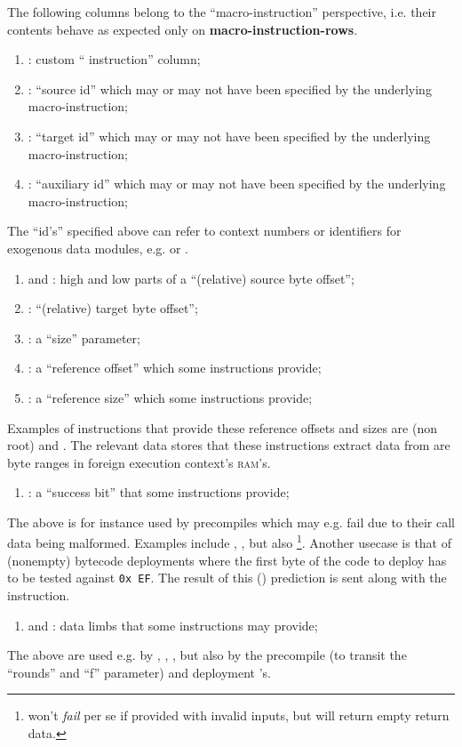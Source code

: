 The following columns belong to the ``macro-instruction'' perspective, i.e. their contents behave as expected only on 
\textbf{macro-instruction-rows}. 
\begin{enumerate}
	\item \macroInst{}:
		custom ``\mmuMod{} instruction'' column;
	\item \macroSrcId{}:
		``source id'' which may or may not have been specified by the underlying macro-instruction;
	\item \macroTgtId{}:
		``target id'' which may or may not have been specified by the underlying macro-instruction;
	\item \macroAuxId{}:
		``auxiliary id'' which may or may not have been specified by the underlying macro-instruction;
\end{enumerate}
The ``id's'' specified above can refer to context numbers or identifiers for exogenous data modules, e.g. \kecStamp{} or \cfi{}.
\begin{enumerate}[resume]
	\item \macroSrcOffsetHi{} and \macroSrcOffsetLo{}:
		high and low parts of a ``(relative) source byte offset'';
	\item \macroTgtOffsetLo{}:
		``(relative) target byte offset'';
	\item \macroSize{}:
		a ``size'' parameter;
	\item \macroRefOffset{}:
		a ``reference offset'' which some instructions provide;
	\item \macroRefSize{}:  
		a ``reference size'' which some instructions provide;
\end{enumerate}
Examples of instructions that provide these reference offsets and sizes are (non root)  and .
The relevant data stores that these instructions extract data from are byte ranges in foreign execution context's \textsc{ram}'s.
\begin{enumerate}[resume]
	\item \macroSuccessBit{}:
		a ``success bit'' that some instructions provide;
\end{enumerate}
The above is for instance used by precompiles which may e.g. fail due to their call data being malformed.
Examples include , ,  but also \footnote{ won't \emph{fail} per se if provided with invalid inputs, but will return empty return data.}.
Another usecase is that of (nonempty) bytecode deployments where the first byte of the code to deploy has to be tested against \texttt{0x\,EF}.
The result of this (\hubMod{}) prediction is sent along with the \mmuMod{} instruction.
\begin{enumerate}[resume]
	\item \macroLimbOne{} and \macroLimbTwo{}:
		data limbs that some instructions may provide;
\end{enumerate}
The above are used e.g. by
,
,
,
but also by the  precompile (to transit the ``rounds'' and ``f'' parameter)
and deployment 's.

